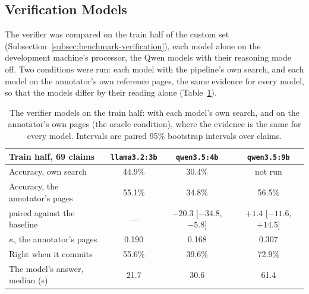 
\subsection{Verification Models}
\label{subsec:results-verifier-models}

The verifier was compared on the train half of the custom set
(Subsection~\ref{subsec:benchmark-verification}), each model alone on
the development machine's processor, the Qwen models with their
reasoning mode off. Two conditions were run: each model with the
pipeline's own search, and each model on the annotator's own reference
pages, the same evidence for every model, so that the models differ by
their reading alone (Table~\ref{tab:verifier-models}).

\begin{table}[ht]
\centering
\small
\begin{tabular}{@{}lccc@{}}
\toprule
Train half, 69 claims & \texttt{llama3.2:3b} & \texttt{qwen3.5:4b} & \texttt{qwen3.5:9b} \\
\midrule
Accuracy, own search & 44.9\% & 30.4\% & not run \\
Accuracy, the annotator's pages & 55.1\% & 34.8\% & 56.5\% \\
\quad paired against the baseline & --- & $-20.3$ [$-34.8$, $-5.8$] & $+1.4$ [$-11.6$, $+14.5$] \\
$\kappa$, the annotator's pages & 0.190 & 0.168 & 0.307 \\
Right when it commits & 55.6\% & 39.6\% & 72.9\% \\
The model's answer, median (s) & 21.7 & 30.6 & 61.4 \\
\bottomrule
\end{tabular}
\caption[The verifier models compared]{The verifier models on the train
half: with each model's own search, and on the annotator's own pages
(the oracle condition), where the evidence is the same for every model.
Intervals are paired 95\% bootstrap intervals over claims.}
\label{tab:verifier-models}
\end{table}

